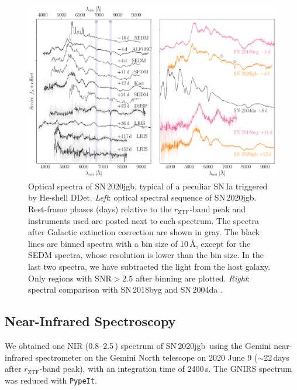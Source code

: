 \documentclass[twocolumn]{aastex631}
\newcommand{\sn}{SN\,2020jgb}
\begin{document}

\begin{figure}
    \centering
    \includegraphics[width=\textwidth]{optical_spec_evolution.pdf}
    \caption{Optical spectra of \sn, typical of a peculiar SN\,Ia triggered by He-shell DDet. \textit{Left}: optical spectral sequence of \sn. Rest-frame phases (days) relative to the $r_\mathrm{ZTF}$-band peak and instruments used are posted next to each spectrum. The spectra after Galactic extinction correction are shown in gray. The black lines are binned spectra with a bin size of 10\,\AA, except for the SEDM spectra, whose resolution is lower than the bin size. In the last two spectra, we have subtracted the light from the host galaxy. Only regions with $\mathrm{SNR}>2.5$ after binning are plotted. 
    \textit{Right}: spectral comparison with SN\,2018byg \citep[subluminous He-shell DDet;][]{de_18byg_2019} and SN\,2004da \citep[normal luminosity;][]{Silverman_2012}.}
    \label{fig:spec_evo}
\end{figure}

\subsection{Near-Infrared Spectroscopy}
We obtained one NIR (0.8--2.5\,\micron) spectrum of \sn\ using the Gemini near-infrared spectrometer \citep[GNIRS;][]{GNIRS1998} on the Gemini North telescope on 2020 June 9 ($\sim$22\,days after $r_\mathrm{ZTF}$-band peak), with an integration time of 2400\,s. The GNIRS spectrum was reduced with \texttt{PypeIt}.
\end{document}
